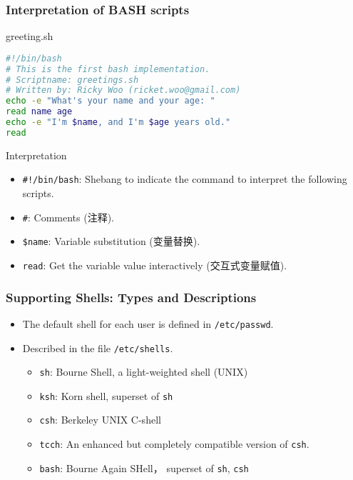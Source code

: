 \documentclass[red]{beamer}
\begin{document}
\begin{CJK*}{UTF8}{gbsn}
\begin{frame}
\frametitle{Interpretation of BASH scripts}
\begin{block}{\centering greeting.sh}
\begin{lstlisting}[language=bash]
#!/bin/bash
# This is the first bash implementation.
# Scriptname: greetings.sh
# Written by: Ricky Woo (ricket.woo@gmail.com)
echo -e "What's your name and your age: "
read name age
echo -e "I'm $name, and I'm $age years old."
read
\end{lstlisting}
\end{block}
\begin{block}{\centering Interpretation}
\begin{itemize}
	\item \lstinline{#!/bin/bash}: Shebang to indicate the command 
		to interpret the following scripts.
	\item \lstinline{#}: Comments (注释).
	\item \lstinline{$name}: Variable substitution (变量替换).
	\item \lstinline{read}: Get the variable value interactively 
		(交互式变量赋值). 
\end{itemize}
\end{block}
\end{frame}

\begin{frame}
\frametitle{Supporting Shells: Types and Descriptions}
\begin{itemize}
	\item The default shell for each user is defined in 
		\texttt{/etc/passwd}.
	\vspace{0.2in}
	\item Described in the file \texttt{/etc/shells}.
	\begin{itemize}
		\item \texttt{sh}: Bourne Shell, a light-weighted shell (UNIX)
		\item \texttt{ksh}: Korn shell, superset of \texttt{sh}
		\item \texttt{csh}: Berkeley UNIX C-shell
		\item \texttt{tcch}: An enhanced but completely compatible 
			version of \texttt{csh}.
		\item \texttt{bash}: Bourne Again SHell， superset of \texttt{sh}, 
			\texttt{csh}
	\end{itemize}
\end{itemize}
\end{frame}


\end{CJK*}
\end{document}
